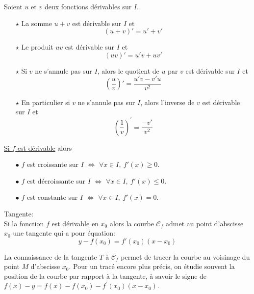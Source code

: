 \documentclass[a4paper, 11pt]{article}
\begin{document}
\begin{prop} Soient $u$ et $v$ deux fonctions d\'erivables sur $I$.
\begin{itemize}
\item[$\star$] La somme $u+v$ est d\'erivable sur $I$ et $$(u+v)'=u' +v' $$

\item[$\star$] Le produit $uv$ est d\'erivable sur $I$ et $$(uv)'=u'v +uv'$$

\item[$\star$] Si $v$ ne s'annule pas sur $I$, alors le quotient de $u$ par $v$ est d\'erivable sur $I$ et $$\left(\dfrac{u}{v}\right)'=\frac{u'v-v'u}{v^2}$$

\item[$\star$] En particulier si $v$ ne s'annule pas sur $I$, alors l'inverse de $v$ est d\'erivable sur $I$ et $$\left(\dfrac{1}{v}\right)^{\prime}=\frac{-v'}{v^2}$$

\end{itemize}
\end{prop}


\begin{prop} \underline{Si  $f$ est d\'erivable} alors
\begin{itemize}
\item[$\bullet$] $f$ est croissante sur $I$ $\Longleftrightarrow$ $\forall x\in I,\ f'(x)\geqslant 0$.
\item[$\bullet$] $f$ est d\'ecroissante sur $I$ $\Longleftrightarrow$ $\forall x\in I,\ f'(x)\leqslant 0$.
\item[$\bullet$] $f$ est constante sur $I$ $\Longleftrightarrow$ $\forall x\in I,\ f'(x)= 0$.
\end{itemize}
\end{prop}



\begin{prop} Tangente:\\
\noindent Si la fonction $f$ est d\'erivable en $x_0$ alors la courbe $\mathcal{C}_f$ admet au point d'abscisse $x_0$ une tangente qui a pour \'equation: 
$$ y- f(x_0) = f'(x_0)(x-x_0)$$
\end{prop}



\begin{rem}
La connaissance de la tangente $T$ \`a $\mathcal{C}_f$ permet de tracer la courbe au voisinage du point $M$ d'abscisse $x_0$. Pour un trac\'e encore plus pr\'ecis, on \'etudie souvent la position de la courbe par rapport \`a la tangente, \`a savoir le signe de $f(x)-y=f(x)-f(x_0)-f^{\prime}(x_0)(x-x_0)$.
\end{rem}
\end{document}
